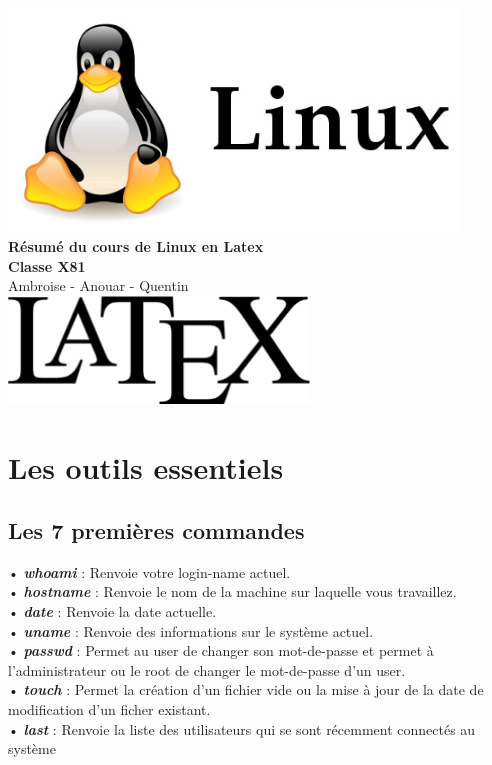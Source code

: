 \documentclass[a4paper, 11pt, french, oneside]{book}
\begin{document}
	\begin{titlepage}
		\begin{center}
			\includegraphics[width=12cm]{linux.jpg}%
			\hspace{60pt}%
			\vspace{50pt}%
			\LARGE
			\textbf{Résumé du cours de Linux en Latex}\\
			\color{red}
			\textbf{Classe X81}\\
			Ambroise - Anouar - Quentin\\
			\vspace{50pt}%
			\includegraphics[width=8cm]{latex.jpg}%
		\end{center}
	\end{titlepage}
		      
	\tableofcontents
	\frontmatter
	\mainmatter
	\chapter{Les outils essentiels}
		\section{Les 7 premières commandes}
         • \textbf {\textit{\color{red}whoami}} : Renvoie votre login-name actuel.\\
         • \textbf {\textit{\color{red}hostname}} : Renvoie le nom de la machine sur laquelle vous travaillez.\\
         • \textbf {\textit{\color{red}date}} : Renvoie la date actuelle.\\
         • \textbf {\textit{\color{red}uname}} : Renvoie des informations sur le système actuel.\\
         • \textbf{\textit{\color{red}passwd}} : Permet au user de changer son mot-de-passe et permet à l’administrateur ou le root de changer le mot-de-passe d’un user.\\
         • \textbf{\textit{\color{red}touch}} : Permet la création d’un fichier vide ou la mise à jour de la date de modification d’un ficher existant.\\
         • \textbf{\textit{\color{red}last}} : Renvoie la liste des utilisateurs qui se sont récemment connectés au système\\
\end{document}

